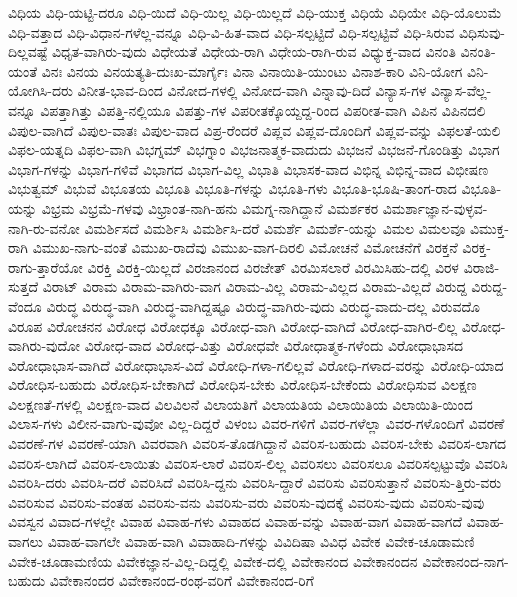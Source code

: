 {ವಿಧಿಯ
ವಿಧಿ-ಯಟ್ಟಿ-ದರೂ
ವಿಧಿ-ಯಿದೆ
ವಿಧಿ-ಯಿಲ್ಲ
ವಿಧಿ-ಯಿಲ್ಲದೆ
ವಿಧಿ-ಯುಕ್ತ
ವಿಧಿಯೆ
ವಿಧಿಯೇ
ವಿಧಿ-ಯೊಲುಮೆ
ವಿಧಿ-ವತ್ತಾದ
ವಿಧಿ-ವಿಧಾನ-ಗಳೆಲ್ಲ-ವನ್ನೂ
ವಿಧಿ-ವಿ-ಹಿತ-ವಾದ
ವಿಧಿ-ಸಲ್ಪಟ್ಟಿದೆ
ವಿಧಿ-ಸಲ್ಪಟ್ಟಿವೆ
ವಿಧಿ-ಸಿರುವ
ವಿಧಿಸುವು-ದಿಲ್ಲವಷ್ಟೆ
ವಿಧೃತ-ವಾಗಿರು-ವುದು
ವಿಧೇಯತೆ
ವಿಧೇಯ-ರಾಗಿ
ವಿಧೇಯ-ರಾಗಿ-ರುವ
ವಿಧ್ಯುಕ್ತ-ವಾದ
ವಿನಂತಿ
ವಿನಂತಿ-ಯಂತೆ
ವಿನಃ
ವಿನಯ
ವಿನಯತ್ಯತಿ-ದುಃಖ-ಮಾರ್ಗೈಃ
ವಿನಾ
ವಿನಾಯಿತಿ-ಯುಂಟು
ವಿನಾಶ-ಕಾರಿ
ವಿನಿ-ಯೋಗ
ವಿನಿ-ಯೋಗಿಸಿ-ದರು
ವಿನೀತ-ಭಾವ-ದಿಂದ
ವಿನೋದ-ಗಳಲ್ಲಿ
ವಿನೋದ-ವಾಗಿ
ವಿನ್ನಾವು-ದಿದೆ
ವಿನ್ಯಾಸ-ಗಳ
ವಿನ್ಯಾಸ-ವೆಲ್ಲ-ವನ್ನೂ
ವಿಪತ್ತಾಗಿತ್ತು
ವಿಪತ್ತಿ-ನಲ್ಲಿಯೂ
ವಿಪತ್ತು-ಗಳ
ವಿಪರೀತಕ್ಕೊಯ್ದದ್ದ-ರಿಂದ
ವಿಪರೀತ-ವಾಗಿ
ವಿಪಿನ
ವಿಪಿನದಲಿ
ವಿಪುಲ-ವಾಗಿದೆ
ವಿಪುಲ-ವಾತಃ
ವಿಪುಲ-ವಾದ
ವಿಪ್ರ-ರೆಂದರೆ
ವಿಪ್ಲವ
ವಿಪ್ಲವ-ದೊಂದಿಗೆ
ವಿಪ್ಲವ-ವನ್ನು
ವಿಫಲತೆ-ಯಲಿ
ವಿಫಲ-ಯತ್ನದಿ
ವಿಫಲ-ವಾಗಿ
ವಿಭಗ್ನಮ್
ವಿಭಗ್ನಾಂ
ವಿಭಜನಾತ್ಮಕ-ವಾದುದು
ವಿಭಜನೆ
ವಿಭಜನೆ-ಗೊಂಡಿತ್ತು
ವಿಭಾಗ
ವಿಭಾಗ-ಗಳನ್ನು
ವಿಭಾಗ-ಗಳಿವೆ
ವಿಭಾಗದ
ವಿಭಾಗ-ವಿಲ್ಲ
ವಿಭಾತಿ
ವಿಭಾಸಕ-ವಾದ
ವಿಭಿನ್ನ
ವಿಭಿನ್ನ-ವಾದ
ವಿಭೀಷಣ
ವಿಭುತ್ವಮ್
ವಿಭುವೆ
ವಿಭೂತಯ
ವಿಭೂತಿ
ವಿಭೂತಿ-ಗಳನ್ನು
ವಿಭೂತಿ-ಗಳು
ವಿಭೂತಿ-ಭೂಷಿ-ತಾಂಗ-ರಾದ
ವಿಭೂತಿ-ಯನ್ನು
ವಿಭ್ರಮ
ವಿಭ್ರಮೆ-ಗಳವು
ವಿಭ್ರಾಂತ-ನಾಗಿ-ಹನು
ವಿಮಗ್ನ-ನಾಗಿದ್ದಾನೆ
ವಿಮರ್ಶಕರ
ವಿಮರ್ಶಾಜ್ಞಾನ-ವುಳ್ಳವ-ನಾಗಿ-ರು-ವನೋ
ವಿಮರ್ಶಿಸದೆ
ವಿಮರ್ಶಿಸಿ
ವಿಮರ್ಶಿಸಿ-ದರೆ
ವಿಮರ್ಶೆ
ವಿಮರ್ಶೆ-ಯನ್ನು
ವಿಮಲ
ವಿಮಲವೂ
ವಿಮುಕ್ತ-ರಾಗಿ
ವಿಮುಖ-ನಾಗು-ವಂತೆ
ವಿಮುಖ-ರಾದೆವು
ವಿಮುಖ-ವಾಗ-ದಿರಲಿ
ವಿಮೋಚನೆ
ವಿಮೋಚನೆಗೆ
ವಿರಕ್ತನೆ
ವಿರಕ್ತ-ರಾಗು-ತ್ತಾರೆಯೋ
ವಿರಕ್ತಿ
ವಿರಕ್ತಿ-ಯಿಲ್ಲದೆ
ವಿರಜಾನಂದ
ವಿರಜೇತ್
ವಿರಮಿಸಲಾರೆ
ವಿರಮಿಸಿಹು-ದಲ್ಲಿ
ವಿರಳ
ವಿರಾಜಿ-ಸುತ್ತದೆ
ವಿರಾಟ್
ವಿರಾಮ
ವಿರಾಮ-ವಾಗಿರು-ವಾಗ
ವಿರಾಮ-ವಿಲ್ಲ
ವಿರಾಮ-ವಿಲ್ಲದ
ವಿರಾಮ-ವಿಲ್ಲದೆ
ವಿರುದ್ದ
ವಿರುದ್ದ-ವೆಂದೂ
ವಿರುದ್ಧ
ವಿರುದ್ಧ-ವಾಗಿ
ವಿರುದ್ಧ-ವಾಗಿದ್ದಷ್ಟೂ
ವಿರುದ್ಧ-ವಾಗಿರು-ವುದು
ವಿರುದ್ಧ-ವಾದು-ದಲ್ಲ
ವಿರುವದೊ
ವಿರೂಪ
ವಿರೋಚನನ
ವಿರೋಧ
ವಿರೋಧಕ್ಕೂ
ವಿರೋಧ-ವಾಗಿ
ವಿರೋಧ-ವಾಗಿದೆ
ವಿರೋಧ-ವಾಗಿರ-ಲಿಲ್ಲ
ವಿರೋಧ-ವಾಗಿರು-ವುದೋ
ವಿರೋಧ-ವಾದ
ವಿರೋಧ-ವಿತ್ತು
ವಿರೋಧವೇ
ವಿರೋಧಾತ್ಮಕ-ಗಳೆಂದು
ವಿರೋಧಾಭಾಸದ
ವಿರೋಧಾಭಾಸ-ವಾಗಿದೆ
ವಿರೋಧಾಭಾಸ-ವಿದೆ
ವಿರೋಧಿ-ಗಳಾ-ಗಲಿಲ್ಲವೆ
ವಿರೋಧಿ-ಗಳಾದ-ವರನ್ನು
ವಿರೋಧಿ-ಯಾದ
ವಿರೋಧಿಸ-ಬಹುದು
ವಿರೋಧಿಸ-ಬೇಕಾಗಿದೆ
ವಿರೋಧಿಸ-ಬೇಕು
ವಿರೋಧಿಸ-ಬೇಕೆಂದು
ವಿರೋಧಿಸುವ
ವಿಲಕ್ಷಣ
ವಿಲಕ್ಷಣತೆ-ಗಳಲ್ಲಿ
ವಿಲಕ್ಷಣ-ವಾದ
ವಿಲವಿಲನೆ
ವಿಲಾಯತಿಗೆ
ವಿಲಾಯತಿಯ
ವಿಲಾಯಿತಿಯ
ವಿಲಾಯಿತಿ-ಯಿಂದ
ವಿಲಾಸ-ಗಳು
ವಿಲೀನ-ವಾಗು-ವುವೋ
ವಿಲ್ಲ-ದಿದ್ದರೆ
ವಿಳಂಬ
ವಿವರ-ಗಳಿಗೆ
ವಿವರ-ಗಳೆಲ್ಲಾ
ವಿವರ-ಗಳೊಂದಿಗೆ
ವಿವರಣೆ
ವಿವರಣೆ-ಗಳ
ವಿವರಣೆ-ಯಾಗಿ
ವಿವರವಾಗಿ
ವಿವರಿಸ-ತೊಡಗಿದ್ದಾನೆ
ವಿವರಿಸ-ಬಹುದು
ವಿವರಿಸ-ಬೇಕು
ವಿವರಿಸ-ಲಾಗದ
ವಿವರಿಸ-ಲಾಗಿದೆ
ವಿವರಿಸ-ಲಾಯಿತು
ವಿವರಿಸ-ಲಾರೆ
ವಿವರಿಸ-ಲಿಲ್ಲ
ವಿವರಿಸಲು
ವಿವರಿಸಲೂ
ವಿವರಿಸಲ್ಪಟ್ಟುವೊ
ವಿವರಿಸಿ
ವಿವರಿಸಿ-ದರು
ವಿವರಿಸಿ-ದರೆ
ವಿವರಿಸಿದೆ
ವಿವರಿಸಿ-ದ್ದನು
ವಿವರಿಸಿ-ದ್ದಾರೆ
ವಿವರಿಸು
ವಿವರಿಸುತ್ತಾನೆ
ವಿವರಿಸು-ತ್ತಿರು-ವರು
ವಿವರಿಸುವ
ವಿವರಿಸು-ವಂತಹ
ವಿವರಿಸು-ವನು
ವಿವರಿಸು-ವರು
ವಿವರಿಸು-ವುದಕ್ಕೆ
ವಿವರಿಸು-ವುದು
ವಿವರಿಸು-ವುವು
ವಿವಸ್ವನ
ವಿವಾದ-ಗಳಲ್ಲೇ
ವಿವಾಹ
ವಿವಾಹ-ಗಳು
ವಿವಾಹದ
ವಿವಾಹ-ವನ್ನು
ವಿವಾಹ-ವಾಗ
ವಿವಾಹ-ವಾಗದೆ
ವಿವಾಹ-ವಾಗಲು
ವಿವಾಹ-ವಾಗಲೇ
ವಿವಾಹ-ವಾಗಿ
ವಿವಾಹಾದಿ-ಗಳನ್ನು
ವಿವಿದಿಷಾ
ವಿವಿಧ
ವಿವೇಕ
ವಿವೇಕ-ಚೂಡಾಮಣಿ
ವಿವೇಕ-ಚೂಡಾಮಣಿಯ
ವಿವೇಕಜ್ಞಾನ-ವಿಲ್ಲ-ದಿದ್ದಲ್ಲಿ
ವಿವೇಕ-ದಲ್ಲಿ
ವಿವೇಕಾನಂದ
ವಿವೇಕಾನಂದನ
ವಿವೇಕಾನಂದ-ನಾಗ-ಬಹುದು
ವಿವೇಕಾನಂದರ
ವಿವೇಕಾನಂದ-ರಂಥ-ವರಿಗೆ
ವಿವೇಕಾನಂದ-ರಿಗೆ
}
